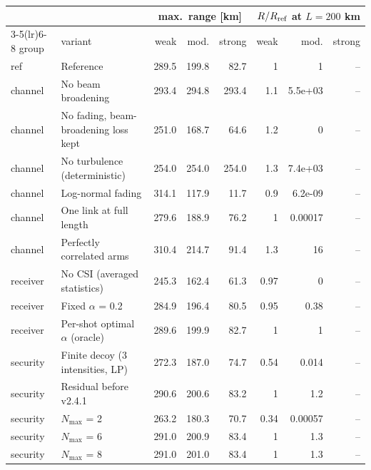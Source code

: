 \begin{tabular}{llrrrrrr}
\toprule
 & & \multicolumn{3}{c}{max.\ range [km]} & \multicolumn{3}{c}{$R/R_{\rm ref}$ at $L=200$ km} \\
\cmidrule(lr){3-5}\cmidrule(lr){6-8}
group & variant & weak & mod. & strong & weak & mod. & strong \\
\midrule
ref & Reference & 289.5 & 199.8 & 82.7 & 1 & 1 & -- \\
channel & No beam broadening & 293.4 & 294.8 & 293.4 & 1.1 & 5.5e+03 & -- \\
channel & No fading, beam-broadening loss kept & 251.0 & 168.7 & 64.6 & 1.2 & 0 & -- \\
channel & No turbulence (deterministic) & 254.0 & 254.0 & 254.0 & 1.3 & 7.4e+03 & -- \\
channel & Log-normal fading & 314.1 & 117.9 & 11.7 & 0.9 & 6.2e-09 & -- \\
channel & One link at full length & 279.6 & 188.9 & 76.2 & 1 & 0.00017 & -- \\
channel & Perfectly correlated arms & 310.4 & 214.7 & 91.4 & 1.3 & 16 & -- \\
receiver & No CSI (averaged statistics) & 245.3 & 162.4 & 61.3 & 0.97 & 0 & -- \\
receiver & Fixed $\alpha$ = 0.2 & 284.9 & 196.4 & 80.5 & 0.95 & 0.38 & -- \\
receiver & Per-shot optimal $\alpha$ (oracle) & 289.6 & 199.9 & 82.7 & 1 & 1 & -- \\
security & Finite decoy (3 intensities, LP) & 272.3 & 187.0 & 74.7 & 0.54 & 0.014 & -- \\
security & Residual before v2.4.1 & 290.6 & 200.6 & 83.2 & 1 & 1.2 & -- \\
security & $N_{\max}$ = 2 & 263.2 & 180.3 & 70.7 & 0.34 & 0.00057 & -- \\
security & $N_{\max}$ = 6 & 291.0 & 200.9 & 83.4 & 1 & 1.3 & -- \\
security & $N_{\max}$ = 8 & 291.0 & 201.0 & 83.4 & 1 & 1.3 & -- \\
\bottomrule
\end{tabular}
